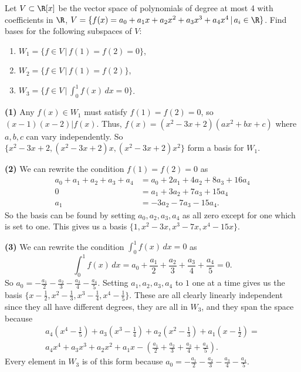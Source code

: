 \begin{problem}
  Let $V\subset \R[x]$ be the vector space of polynomials of degree at most
 4 with coefficients in $\R$, $V = \{ f(x) = a_0 + a_1x + a_2x^2 + a_3x^3 + a_4x^4 \,|\, a_i \in \R \}$. Find bases for the following subspaces of $V$:
 \begin{enumerate}
   \item $W_1 = \{ f \in V \,|\, f(1) = f(2) = 0 \}$,
   \item $W_2 = \{ f \in V \,|\, f(1) = f(2) \}$,
   \item $W_3 = \{ f \in V \,|\, \int_0^1 f(x)\,dx = 0 \}$.
 \end{enumerate}
\end{problem}

\textbf{(1)} Any $f(x)\in W_1$ must satisfy $f(1)=f(2)=0$, so $(x-1)(x-2) | f(x)$. Thus, $f(x)=(x^2-3x+2)(ax^2+bx+c)$ where $a,b,c$ can vary independently. So $\{x^2-3x+2,(x^2-3x+2)x, (x^2-3x+2)x^2\}$ form a basis for $W_1$.         

\textbf{(2)} We can rewrite the condition $f(1)=f(2)=0$ as
\begin{align*}
  a_0+a_1+a_2+a_3+a_4&=a_0+2a_1+4a_2+8a_3+16a_4\\
  0&=a_1+3a_2+7a_3+15a_4\\
  a_1&=-3a_2-7a_3-15a_4.
\end{align*}  
So the basis can be found by setting $a_0,a_2,a_3,a_4$ as all zero except for one which is set to one. This gives us a basis $\{1,x^2-3x,x^3-7x,x^4-15x\}$.   

\textbf{(3)} We can rewrite the condition $\int_0^1 f(x)\,dx = 0$ as 
\[
  \int_0^1 f(x)\,dx = a_0+\frac{a_1}{2}+\frac{a_2}{3}+\frac{a_3}{4}+\frac{a_4}{5}=0
.\]  
So $a_0=-\frac{a_1}{2}-\frac{a_2}{3}-\frac{a_3}{4}-\frac{a_4}{5}$. Setting $a_1,a_2,a_3,a_4$ to $1$ one at a time gives us the basis $\{x-\frac{1}{2}, x^2-\frac{1}{3}, x^3-\frac{1}{4}, x^4-\frac{1}{5}\}$. These are all clearly linearly independent since they all have different degrees, they are all in $W_3$, and they span the space because
\begin{align*}
  a_4\left(x^4-\frac{1}{5}\right)+a_3\left(x^3-\frac{1}{4}\right)+a_2\left(x^2-\frac{1}{3}\right)+a_1\left(x-\frac{1}{2}\right)=
  \\a_4x^4+a_3x^3+a_2x^2+a_1x-\left(\frac{a_1}{2}+\frac{a_2}{3}+\frac{a_3}{4}+\frac{a_4}{5}\right).
\end{align*}
 Every element in $W_3$ is of this form because $a_0=-\frac{a_1}{2}-\frac{a_2}{3}-\frac{a_3}{4}-\frac{a_4}{5}$.  